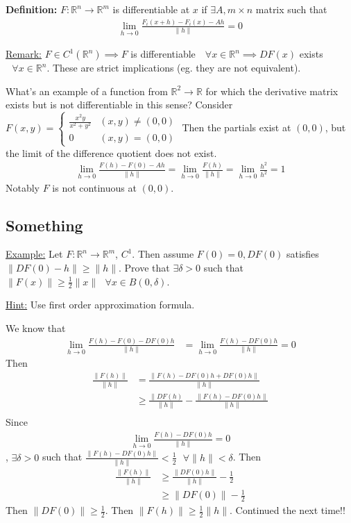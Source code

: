 \documentclass{article}
\newcommand*{\txt}[1]{\text{ #1 }}%
\newcommand*{\fora}{\txt{}\forall}%
\newcommand*{\rr}{\mathbb{R}}%
\begin{document}
\textbf{Definition:} $F:\rr^n\to\rr^m$ is differentiable at $x$ if $\exists A,m\times n$ matrix such that \begin{align*}
    \lim_{h\to 0}\frac{F_i(x+h)-F_i(x)-Ah}{\|h\|}=0
\end{align*}

\underline{Remark:} $F\in C^1(\rr^n)\implies F$ is differentiable $\fora x\in \rr^n\implies DF(x)$ exists $\fora x\in \rr^n$. These are strict implications (eg. they are not equivalent). 

What's an example of a function from $\rr^2\to \rr$ for which the derivative matrix exists but is not differentiable in this sense? Consider $F(x,y)=\begin{cases}
    \frac{x^2y}{x^2+y^2} & (x,y)\neq (0,0)\\
    0 & (x,y)=(0,0)
\end{cases}$ Then the partials exist at $(0,0)$, but the limit of the difference quotient does not exist. \begin{align*}
    \lim_{h\to 0}\frac{F(h)-F(0)-Ah}{\|h\|}=\lim_{h\to 0}\frac{F(h)}{\|h\|}=\lim_{h\to 0}\frac{h^2}{h^2}=1
\end{align*} Notably $F$ is not continuous at $(0,0)$.

\subsection{Something}

\underline{Example:} Let $F:\rr^n\to \rr^m$, $C^1$. Then assume $F(0)=0, DF(0)$ satisfies $\|DF(0)-h\|\geq \|h\|$. Prove that $\exists \delta>0$ such that $\|F(x)\|\geq \frac{1}{2}\|x\|\fora x\in B(0,\delta)$.

\underline{Hint:} Use first order approximation formula.

We know that \begin{align*}
    \lim_{h\to 0}\frac{F(h)-F(0)-DF(0)h}{\|h\|}&=\lim_{h\to 0} \frac{F(h)-DF(0)h}{\|h\|}=0
\end{align*} Then \begin{align*}
    \frac{\|F(h)\|}{\|h\|}&=\frac{\|F(h)-DF(0)h+DF(0)h\|}{\|h\|}\\
    &\geq \frac{\|DF(h)}{\|h\|}-\frac{\|F(h)-DF(0)h\|}{\|h\|}\\
\end{align*} Since \begin{align*}
    \lim_{h\to 0}\frac{F(h)-DF(0)h}{\|h\|}=0
\end{align*}, $\exists \delta>0$ such that $\frac{\|F(h)-DF(0)h\|}{\|h\|}<\frac{1}{2}\fora \|h\|<\delta$. Then \begin{align*}
    \frac{\|F(h)\|}{\|h\|}&\geq \frac{\|DF(0)h\|}{\|h\|}-\frac{1}{2}\\
    &\geq \|DF(0)\|-\frac{1}{2}
\end{align*} Then $\|DF(0)\|\geq \frac{1}{2}$. Then $\|F(h)\|\geq \frac{1}{2}\|h\|$. Continued the next time!!
\end{document}
